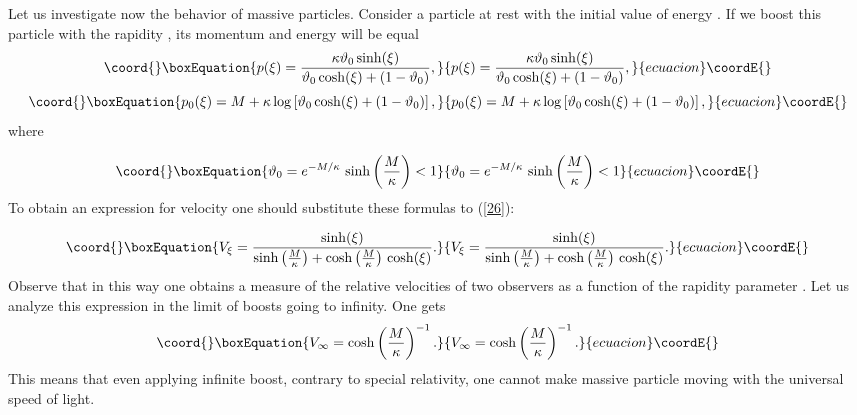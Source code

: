 \documentclass[a4paper,a4paper]{article}
\begin{document}
 Let us investigate now the behavior of massive particles. Consider a particle at rest with the initial value of energy \coordHE{}. If we boost this particle with the rapidity \myHighlight{$\xi$}\coordHE{}, its momentum and energy will be equal \cite{rbgacjkg}
\begin{equation}\coord{}\boxEquation{\label{28}
  p(\xi) = \frac{\kappa\vartheta_0\sinh(\xi)}{\vartheta_0\cosh(\xi) +(1-\vartheta_0)},
}{p(\xi) = \frac{\kappa\vartheta_0\sinh(\xi)}{\vartheta_0\cosh(\xi) +(1-\vartheta_0)},
}{ecuacion}\coordE{}\end{equation}
\begin{equation}\coord{}\boxEquation{\label{29}
  p_0(\xi) = M + \kappa\log\left[\vartheta_0\cosh(\xi) +(1-\vartheta_0)\right],
}{p_0(\xi) = M + \kappa\log\left[\vartheta_0\cosh(\xi) +(1-\vartheta_0)\right],
}{ecuacion}\coordE{}\end{equation}
where

\begin{equation}\coord{}\boxEquation{\label{29a}
  \vartheta_0 = e^{-M/\kappa}\, \sinh\left(\frac{M}\kappa\right) <1
}{\vartheta_0 = e^{-M/\kappa}\, \sinh\left(\frac{M}\kappa\right) <1
}{ecuacion}\coordE{}\end{equation}
To obtain an expression for velocity one should substitute these formulas to (\ref{26}):

\begin{equation}\coord{}\boxEquation{\label{30}
 V_\xi = \frac{\sinh(\xi)}{\sinh\left(\frac{M}{\kappa}\right) +\cosh\left(\frac{M}{\kappa}\right)\, \cosh(\xi) }.
}{V_\xi = \frac{\sinh(\xi)}{\sinh\left(\frac{M}{\kappa}\right) +\cosh\left(\frac{M}{\kappa}\right)\, \cosh(\xi) }.
}{ecuacion}\coordE{}\end{equation}
Observe that in this way one obtains a measure of the relative velocities of two observers \coordHE{} as a function of the rapidity parameter \myHighlight{$\xi$}\coordHE{}. Let us analyze this expression in the limit of  boosts going to infinity. One gets
\begin{equation}\coord{}\boxEquation{\label{31}
 V_\infty = \cosh\left(\frac M\kappa\right)^{-1}.
}{V_\infty = \cosh\left(\frac M\kappa\right)^{-1}.
}{ecuacion}\coordE{}\end{equation}
This means that even applying infinite boost, contrary to special relativity, one cannot make massive particle moving with the universal speed of light.
\newline
\end{document}

